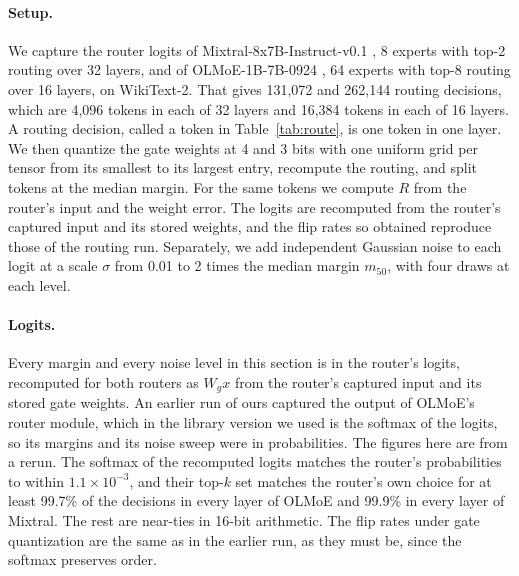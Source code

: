 \documentclass[journal]{IEEEtran}
\begin{document}
\paragraph{Setup.} We capture the router logits of Mixtral-8x7B-Instruct-v0.1
\citep{jiang2024mixtral}, 8 experts with top-2 routing over 32 layers, and of OLMoE-1B-7B-0924
\citep{muennighoff2025olmoe}, 64 experts with top-8 routing over 16 layers, on WikiText-2. That
gives 131{,}072 and 262{,}144 routing decisions, which are 4{,}096 tokens in each of 32 layers and
16{,}384 tokens in each of 16 layers. A routing decision, called a token in
Table~\ref{tab:route}, is one token in one layer. We then quantize the gate weights at 4
and 3 bits with one uniform grid per tensor from its smallest to its largest entry, recompute the
routing, and split tokens at the median margin. For the same tokens we compute $R$ from the
router's input and the weight error. The logits are recomputed from the router's captured input
and its stored weights, and the flip rates so obtained reproduce those of the routing run. Separately, we add
independent Gaussian noise to each logit at a scale $\sigma$ from 0.01 to 2 times the median
margin $m_{50}$, with four draws at each level.

\paragraph{Logits.} Every margin and every noise level in this section is in the router's
logits, recomputed for both routers as $W_g x$ from the router's captured input and its stored
gate weights. An earlier run of ours captured the output of OLMoE's router module, which in the
library version we used is the softmax of the logits, so its margins and its noise sweep were in
probabilities. The figures here are from a rerun. The softmax of the recomputed logits matches
the router's probabilities to within $1.1\times10^{-3}$, and their top-$k$ set matches the
router's own choice for at least 99.7\% of the decisions in every layer of OLMoE and 99.9\% in
every layer of Mixtral. The rest are near-ties in 16-bit arithmetic. The flip rates under gate
quantization are the same as in the earlier run, as they must be, since the softmax preserves
order.
\end{document}
